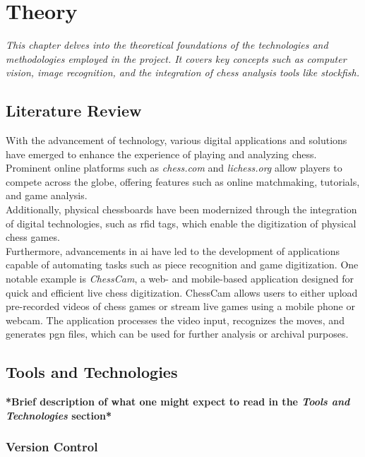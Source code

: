 \chapter{Theory}

\begin{center}
    \textit{This chapter delves into the theoretical foundations of the technologies and methodologies employed in the project. It covers key concepts such as computer vision, image recognition, and the integration of chess analysis tools like \Gls{stockfish}.}    
\end{center}

\section{Literature Review}

With the advancement of technology, various digital applications and solutions have emerged to enhance the experience of playing and analyzing chess. Prominent online platforms such as \textit{chess.com} and \textit{lichess.org} allow players to compete across the globe, offering features such as online matchmaking, tutorials, and game analysis. \\
Additionally, physical chessboards have been modernized through the integration of digital technologies, such as \gls{rfid} tags, which enable the digitization of physical chess games. \cite{quora:shah} \\

Furthermore, advancements in \gls{ai} have led to the development of applications capable of automating tasks such as piece recognition and game digitization. One notable example is \textit{ChessCam}, a web- and mobile-based application designed for quick and efficient live chess digitization. ChessCam allows users to either upload pre-recorded videos of chess games or stream live games using a mobile phone or webcam. The application processes the video input, recognizes the moves, and generates \gls{pgn} files, which can be used for further analysis or archival purposes.

\section{Tools and Technologies}

\textbf{*Brief description of what one might expect to read in the \textit{Tools and Technologies} section*}

\subsection{Version Control}

